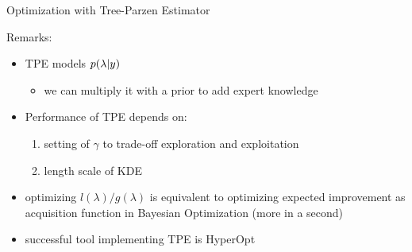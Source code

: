 \begin{frame}[c,fragile]{Optimization with Tree-Parzen Estimator }


Remarks:

\begin{itemize}
	\item TPE models $p(\mathbf{\lambda} | y)$
	\begin{itemize}
		\item we can multiply it with a prior to add expert knowledge
	\end{itemize}
	\smallskip
	\pause
	\item Performance of TPE depends on:
	\begin{enumerate}
		\item setting of $\gamma$ to trade-off exploration and exploitation
		\item length scale of KDE 
	\end{enumerate}
	\pause
	\smallskip
	\item optimizing $l(\lambda)/g(\lambda)$ is equivalent to optimizing expected improvement as acquisition function in Bayesian Optimization (more in a second)
	\pause
	\smallskip
	\item successful tool implementing TPE is HyperOpt
\end{itemize}

\end{frame}
